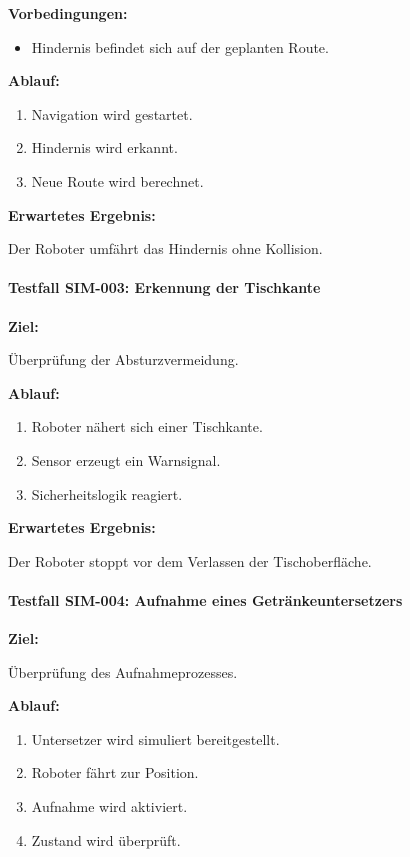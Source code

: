 \documentclass[
  a4paper,
  12pt,
  DIV=12,        %
  parskip=half,  %
  headings=small %
]{scrartcl}
\theoremstyle{definition}
\providecommand{\tightlist}{%
  \setlength{\itemsep}{0pt}\setlength{\parskip}{0pt}}
\theoremstyle{definition}
\begin{document}
\textbf{Vorbedingungen:}

\begin{itemize}
\tightlist
\item
  Hindernis befindet sich auf der geplanten Route.
\end{itemize}

\textbf{Ablauf:}

\begin{enumerate}
\def\labelenumi{\arabic{enumi}.}
\tightlist
\item
  Navigation wird gestartet.
\item
  Hindernis wird erkannt.
\item
  Neue Route wird berechnet.
\end{enumerate}

\textbf{Erwartetes Ergebnis:}

Der Roboter umfährt das Hindernis ohne Kollision.

\paragraph{Testfall SIM-003: Erkennung der
Tischkante}\label{testfall-sim-003-erkennung-der-tischkante}

\textbf{Ziel:}

Überprüfung der Absturzvermeidung.

\textbf{Ablauf:}

\begin{enumerate}
\def\labelenumi{\arabic{enumi}.}
\tightlist
\item
  Roboter nähert sich einer Tischkante.
\item
  Sensor erzeugt ein Warnsignal.
\item
  Sicherheitslogik reagiert.
\end{enumerate}

\textbf{Erwartetes Ergebnis:}

Der Roboter stoppt vor dem Verlassen der Tischoberfläche.

\paragraph{Testfall SIM-004: Aufnahme eines
Getränkeuntersetzers}\label{testfall-sim-004-aufnahme-eines-getruxe4nkeuntersetzers}

\textbf{Ziel:}

Überprüfung des Aufnahmeprozesses.

\textbf{Ablauf:}

\begin{enumerate}
\def\labelenumi{\arabic{enumi}.}
\tightlist
\item
  Untersetzer wird simuliert bereitgestellt.
\item
  Roboter fährt zur Position.
\item
  Aufnahme wird aktiviert.
\item
  Zustand wird überprüft.
\end{enumerate}
\end{document}

